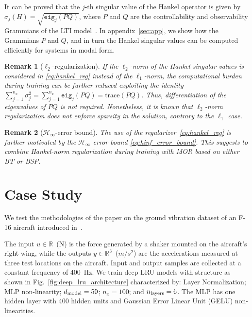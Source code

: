 \documentclass{article} %
\newcommand{\R}{\mathbb{R}}
\newcommand{\hinf}{\mathcal{H}_{\infty}}
\newcommand{\eig}{\mathtt{eig}}
\newcommand{\nx}{{n_x}}
\newcommand{\dmodel}{{d_{\rm model}}}
\newcommand{\nlayers}{{n_{\rm layers}}}
\newtheorem{remark}{Remark}
\begin{document}
It can be proved that the $j$-th singular value of the Hankel operator is given by $\sigma_j(H) = \sqrt{\eig_j(PQ)}$, where $P$ and $Q$ are the controllability and observability Grammians of the LTI model~\cite{katayama05}. 
In appendix~\ref{sec:app}, we show how the Grammians $P$ and $Q$, and in turn the Hankel singular values can be computed efficiently for systems in modal form.
\begin{remark}[$\ell_2$-regularization]\label{rem:L2_reg}
If the $\ell_2$-norm of the Hankel singular values is considered in  \eqref{eq:hankel_reg} instead of the $\ell_1$-norm, the computational burden  during  training can be further reduced exploiting the identity $\sum_{j=1}^{\nx} \sigma^{2}_j = \sum_{j=1}^{\nx} \eig_j(PQ)= \mathrm{trace}(PQ)$. Thus,  differentiation  of the eigenvalues of $PQ$ is not required. Nonetheless, it is known that $\ell_2$-norm regularization does not enforce  sparsity in the solution, contrary to the $\ell_1$ case. 
\end{remark}

\begin{remark}[$\hinf$-error bound]
The use of the regularizer~\eqref{eq:hankel_reg} is further motivated by the $\hinf$ error bound \eqref{eq:hinf_error_bound}. This suggests to combine Hankel-norm regularization during training with MOR based on either BT or BSP.
\end{remark}

\section{Case Study}\label{sec:examples}

We test the methodologies of the paper on the ground vibration dataset of an F-16 aircraft introduced in~\cite{noel2017f}.

The input $u \in \R$~(N) is the force  generated by a shaker mounted on the aircraft's right wing, while the outputs $y \in \R^3$~($m/s^2$) are the accelerations measured at three test locations on the aircraft. Input and output samples are collected at a constant frequency of $400$~Hz.
We train deep LRU models with structure as shown in Fig.~\ref{fig:deep_lru_architecture} characterized by: Layer Normalization; MLP non-linearity; $\dmodel = 50$; $\nx=100$; and $\nlayers=6$. The MLP has one hidden layer with 
400
hidden units and Gaussian Error Linear Unit (GELU) non-linearities.%
\end{document}
